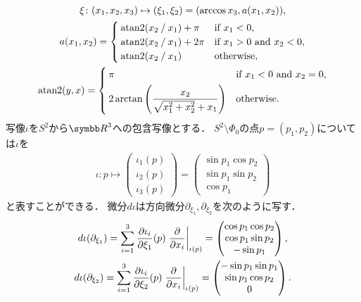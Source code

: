 \documentclass{ltjsarticle}
\begin{document}
\begin{gather*}
    \xi \colon
    (x_1, x_2, x_3)
    \mapsto
    (\xi_1, \xi_2)
    =
    (\arccos x_3, a(x_1, x_2)), \\
    a(x_1, x_2) =
        \begin{cases}
            \operatorname{atan2}(x_2\mathbin{/}x_1) + \pi & \text{if \(x_1 < 0\)}, \\
            \operatorname{atan2}(x_2\mathbin{/}x_1) + 2 \pi & \text{if \(x_1 > 0\) and \(x_2 < 0\)}, \\
            \operatorname{atan2}(x_2\mathbin{/}x_1) & \text{otherwise},
        \end{cases} \\
    \operatorname{atan2}(y, x) =
        \begin{cases}
            \pi & \text{if \(x_1 < 0\) and \(x_2 = 0\)}, \\[3pt]
            \displaystyle
            2\arctan\left(\frac{x_2}{\sqrt{x_1^2 + x_2^2} + x_1}\right) & \text{otherwise.}
        \end{cases}
\end{gather*}
写像\(\iota\)を\(S^2\)から\({\Real}^3\)への包含写像とする．
\(S^2 \setminus \Phi_0\)の点\(p = (p_1, p_2)\)については\(\iota\)を
\begin{align*}
    \iota\colon
    p
    \mapsto
    \begin{pmatrix}
        \iota_1(p) \\
        \iota_2(p) \\
        \iota_3(p)
    \end{pmatrix}
    =
    \begin{pmatrix}
        \sin p_1 \cos p_2 \\
        \sin p_1 \sin p_2 \\
        \cos p_1
    \end{pmatrix}
\end{align*}
と表すことができる．
微分\(d\iota\)は方向微分\(\partial_{\xi_1}, \partial_{\xi_2}\)を次のように写す．
\begin{gather*}
    d\iota (\partial_{\xi_1})
    = \sum_{i = 1}^3 \frac{\partial \iota_i}{\partial \xi_1}(p) \left.\frac{\partial}{\partial x_i}\right\lvert_{\iota(p)}
    =
    \begin{pmatrix}
        \cos p_1 \cos p_2 \\
        \cos p_1 \sin p_2 \\
        -\sin p_1
    \end{pmatrix}, \\
    d\iota(\partial_{\xi_2})
    = \sum_{i = 1}^3 \frac{\partial \iota_i}{\partial \xi_2}(p) \left.\frac{\partial}{\partial x_i}\right\lvert_{\iota(p)}
    =
    \begin{pmatrix}
        - \sin p_1 \sin p_1 \\
        \sin p_1 \cos p_2 \\
        0
    \end{pmatrix}.
\end{gather*}
\end{document}
